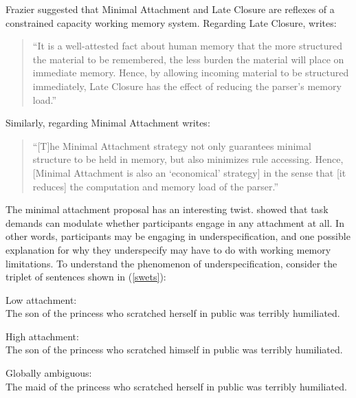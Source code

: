\documentclass{cambridge7A}\usepackage[]{graphicx}\usepackage[]{color}
\begin{document}
Frazier suggested that Minimal Attachment and Late Closure
are reflexes of a constrained capacity working memory
system.  Regarding Late Closure, \cite[39]{Frazier79} writes:

\begin{quote} 
``It is a well-attested fact about human memory that the more structured
the material to be remembered, the less burden the material will place
on immediate memory. Hence, by allowing incoming material to be
structured immediately, Late Closure has the effect of reducing the
parser's memory load.'' 
\end{quote}

Similarly, regarding Minimal Attachment \cite[40]{Frazier79} writes:

\begin{quote} 
``[T]he Minimal Attachment strategy not only guarantees minimal
structure to be held in memory, but also minimizes rule
accessing. Hence, [Minimal Attachment is also an `economical' strategy] in
the sense that [it reduces] the computation and memory load of the parser.''
\end{quote}

The minimal attachment proposal has an interesting twist. \cite{SwetsDesmetClifton2008} showed that task demands can modulate whether participants engage in any attachment at all. In other words, participants may be engaging in  underspecification, 
and one possible explanation for why they underspecify may have to do with working memory limitations.
To understand the phenomenon of underspecification, consider the triplet of sentences shown in (\ref{swets}):

\begin{exe}
\ex \label{swets}
\begin{xlist}
\item Low attachment: \\
The son of the princess who scratched herself in public was terribly humiliated.
\item High attachment: \\
The son of the princess who scratched himself in public was terribly humiliated.
\item Globally ambiguous: \\
The maid of the princess who scratched herself in public was terribly humiliated.
\end{xlist}
\end{exe}
\end{document}
